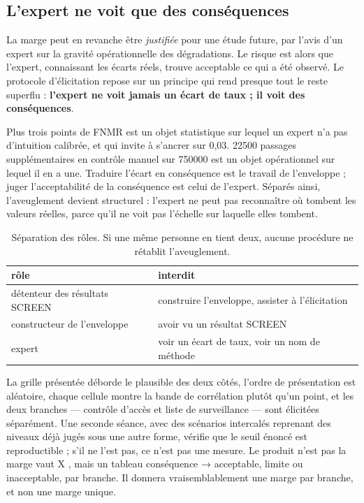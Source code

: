 \documentclass[11pt,a4paper]{article}
\begin{document}
\subsection{L'expert ne voit que des conséquences}

La marge peut en revanche être \emph{justifiée} pour une étude future, par l'avis
d'un expert sur la gravité opérationnelle des dégradations. Le risque est alors que
l'expert, connaissant les écarts réels, trouve acceptable ce qui a été observé. Le
protocole d'élicitation repose sur un principe qui rend presque tout le reste
superflu : \textbf{l'expert ne voit jamais un écart de taux ; il voit des
conséquences}.

\og Plus trois points de FNMR \fg{} est un objet statistique sur lequel un expert n'a
pas d'intuition calibrée, et qui invite à s'ancrer sur 0,03. \og \num{22500} passages
supplémentaires en contrôle manuel sur \num{750000} \fg{} est un objet opérationnel sur
lequel il en a une. Traduire l'écart en conséquence est le travail de l'enveloppe ;
juger l'acceptabilité de la conséquence est celui de l'expert. Séparés ainsi, l'aveuglement
devient structurel : l'expert ne peut pas reconnaître où tombent les valeurs réelles,
parce qu'il ne voit pas l'échelle sur laquelle elles tombent.

\begin{table}[h]
\centering\small
\begin{tabular}{@{}ll@{}}
\toprule
rôle & interdit \\
\midrule
détenteur des résultats SCREEN & construire l'enveloppe, assister à l'élicitation \\
constructeur de l'enveloppe & avoir vu un résultat SCREEN \\
expert & voir un écart de taux, voir un nom de méthode \\
\bottomrule
\end{tabular}
\caption{Séparation des rôles. Si une même personne en tient deux, aucune procédure
ne rétablit l'aveuglement.}
\label{tab:roles}
\end{table}

La grille présentée déborde le plausible des deux côtés, l'ordre de présentation est
aléatoire, chaque cellule montre la bande de corrélation plutôt qu'un point, et les
deux branches — contrôle d'accès et liste de surveillance — sont élicitées séparément.
Une seconde séance, avec des scénarios intercalés reprenant des niveaux déjà jugés
sous une autre forme, vérifie que le seuil énoncé est reproductible ; s'il ne l'est
pas, ce n'est pas une mesure. Le produit n'est pas \og la marge vaut X \fg, mais un
tableau conséquence → acceptable, limite ou inacceptable, par branche. Il donnera
vraisemblablement une marge par branche, et non une marge unique.
\end{document}
